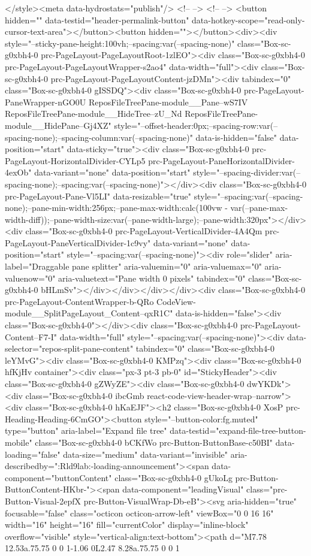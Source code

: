 {{{{{{{{{{{{{{{{{{{{{{{{{{{{{{{</style><meta data-hydrostats="publish"/> <!-- --> <!-- --> <button hidden="" data-testid="header-permalink-button" data-hotkey-scope="read-only-cursor-text-area"></button><button hidden=""></button><div><div style="--sticky-pane-height:100vh;--spacing:var(--spacing-none)" class="Box-sc-g0xbh4-0 prc-PageLayout-PageLayoutRoot-1zlEO"><div class="Box-sc-g0xbh4-0 prc-PageLayout-PageLayoutWrapper-s2ao4" data-width="full"><div class="Box-sc-g0xbh4-0 prc-PageLayout-PageLayoutContent-jzDMn"><div tabindex="0" class="Box-sc-g0xbh4-0 gISSDQ"><div class="Box-sc-g0xbh4-0 prc-PageLayout-PaneWrapper-nGO0U ReposFileTreePane-module__Pane--wS7IV ReposFileTreePane-module__HideTree--zU_Nd ReposFileTreePane-module__HidePane--Gj4XZ" style="--offset-header:0px;--spacing-row:var(--spacing-none);--spacing-column:var(--spacing-none)" data-is-hidden="false" data-position="start" data-sticky="true"><div class="Box-sc-g0xbh4-0 prc-PageLayout-HorizontalDivider-CYLp5 prc-PageLayout-PaneHorizontalDivider-4exOb" data-variant="none" data-position="start" style="--spacing-divider:var(--spacing-none);--spacing:var(--spacing-none)"></div><div class="Box-sc-g0xbh4-0 prc-PageLayout-Pane-Vl5LI" data-resizable="true" style="--spacing:var(--spacing-none);--pane-min-width:256px;--pane-max-width:calc(100vw - var(--pane-max-width-diff));--pane-width-size:var(--pane-width-large);--pane-width:320px"></div><div class="Box-sc-g0xbh4-0 prc-PageLayout-VerticalDivider-4A4Qm prc-PageLayout-PaneVerticalDivider-1c9vy" data-variant="none" data-position="start" style="--spacing:var(--spacing-none)"><div role="slider" aria-label="Draggable pane splitter" aria-valuemin="0" aria-valuemax="0" aria-valuenow="0" aria-valuetext="Pane width 0 pixels" tabindex="0" class="Box-sc-g0xbh4-0 bHLmSv"></div></div></div></div><div class="Box-sc-g0xbh4-0 prc-PageLayout-ContentWrapper-b-QRo CodeView-module__SplitPageLayout_Content--qxR1C" data-is-hidden="false"><div class="Box-sc-g0xbh4-0"></div><div class="Box-sc-g0xbh4-0 prc-PageLayout-Content--F7-I" data-width="full" style="--spacing:var(--spacing-none)"><div data-selector="repos-split-pane-content" tabindex="0" class="Box-sc-g0xbh4-0 leYMvG"><div class="Box-sc-g0xbh4-0 KMPzq"><div class="Box-sc-g0xbh4-0 hfKjHv container"><div class="px-3 pt-3 pb-0" id="StickyHeader"><div class="Box-sc-g0xbh4-0 gZWyZE"><div class="Box-sc-g0xbh4-0 dwYKDk"><div class="Box-sc-g0xbh4-0 ibcGmb react-code-view-header-wrap--narrow"><div class="Box-sc-g0xbh4-0 hKaEJF"><h2 class="Box-sc-g0xbh4-0 XosP prc-Heading-Heading-6CmGO"><button style="--button-color:fg.muted" type="button" aria-label="Expand file tree" data-testid="expand-file-tree-button-mobile" class="Box-sc-g0xbh4-0 bCKfWo prc-Button-ButtonBase-c50BI" data-loading="false" data-size="medium" data-variant="invisible" aria-describedby=":Rld9lab:-loading-announcement"><span data-component="buttonContent" class="Box-sc-g0xbh4-0 gUkoLg prc-Button-ButtonContent-HKbr-"><span data-component="leadingVisual" class="prc-Button-Visual-2epfX prc-Button-VisualWrap-Db-eB"><svg aria-hidden="true" focusable="false" class="octicon octicon-arrow-left" viewBox="0 0 16 16" width="16" height="16" fill="currentColor" display="inline-block" overflow="visible" style="vertical-align:text-bottom"><path d="M7.78 12.53a.75.75 0 0 1-1.06 0L2.47 8.28a.75.75 0 0 1 }}}}}}}}}}}}}}}}}}}}}}}}}}}}}}}
